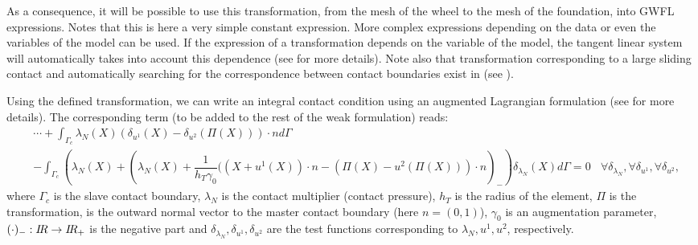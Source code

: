 \documentclass[a4paper,11pt,english]{sphinxmanual}
\begin{document}
\begin{sphinxVerbatim}[commandchars=\\\{\}]
   
\end{sphinxVerbatim}

\sphinxAtStartPar
As a consequence, it will be possible to use this transformation, from the mesh of the wheel to the mesh of the foundation, into GWFL expressions. Notes that this is here a very simple constant expression. More complex expressions depending on the data or even the variables of the model can be used. If the expression of a transformation depends on the variable of the model, the tangent linear system will automatically takes into account this dependence (see  for more details). Note also that transformation corresponding to a large sliding contact and automatically searching for the correspondence between contact boundaries exist in  (see ).

\sphinxAtStartPar
Using the defined transformation, we can write an integral contact condition using an augmented Lagrangian formulation (see  for more details). The corresponding term (to be added to the rest of the weak formulation) reads:
\begin{equation*}
\begin{split}& \cdots +  \int_{\Gamma_c} \lambda_N(X) (\delta_{u^1}(X)-\delta_{u^2}(\Pi(X)))\cdot n d\Gamma \\
& -   \int_{\Gamma_c} \left(\lambda_N(X) + \left(\lambda_N(X) + \dfrac{1}{h_T\gamma_0}((X + u^1(X))\cdot n - (\Pi(X) - u^2(\Pi(X)))\cdot n\right)_-\right)\delta_{\lambda_N}(X) d\Gamma = 0 ~~~~ \forall \delta_{\lambda_N}, \forall \delta_{u^1}, \forall \delta_{u^2},\end{split}
\end{equation*}
\sphinxAtStartPar
where \(\Gamma_c\) is the slave contact boundary, \(\lambda_N\) is the contact multiplier (contact pressure), \(h_T\) is the radius of the element, \(\Pi\) is the transformation,  is the outward normal vector to the master contact boundary (here \(n = (0,1)\)), \(\gamma_0\) is an augmentation parameter, \((\cdot)_-:I\hspace{-0.2em}R\rightarrow I\hspace{-0.2em}R_+\) is the negative part and \(\delta_{\lambda_N}, \delta_{u^1}, \delta_{u^2}\) are the test  functions corresponding to \(\lambda_N, u^1, u^2\), respectively.
\end{document}
